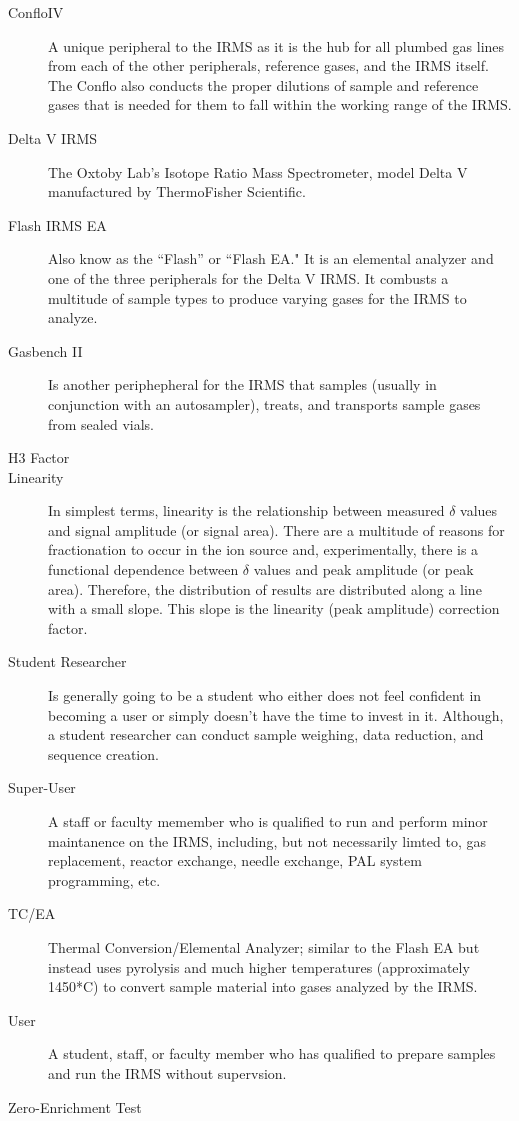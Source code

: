 \documentclass[12pt]{../SOP4_alpha}\usepackage[]{graphicx}\usepackage[]{color}
\begin{document}
\begin{description}

\item[ConfloIV] A unique peripheral to the IRMS as it is the hub for all plumbed gas lines from each of the other peripherals, reference gases, and the IRMS itself. The Conflo also conducts the proper dilutions of sample and reference gases that is needed for them to fall within the working range of the IRMS.

\item[Delta V IRMS] \label{IRMS} The Oxtoby Lab's Isotope Ratio Mass Spectrometer, model Delta V manufactured by ThermoFisher Scientific. 

\item[Flash IRMS EA] Also know as the ``Flash'' or ``Flash EA." It is an elemental analyzer and one of the three peripherals for the Delta V IRMS. It combusts a multitude of sample types to produce varying gases for the IRMS to analyze. 

\item[Gasbench II] Is another periphepheral for the IRMS that samples (usually in conjunction with an autosampler), treats, and transports sample gases from sealed vials.

\item[H3 Factor]

\item[Linearity] In simplest terms, linearity is the relationship between measured $\delta$ values and signal amplitude (or signal area). There are a multitude of reasons for fractionation to occur in the ion source and, experimentally, there is a functional dependence between $\delta$ values and peak amplitude (or peak area). Therefore, the distribution of results are distributed along a line with a small slope. This slope is the linearity (peak amplitude) correction factor. 

\item[Student Researcher] Is generally going to be a student who either does not feel confident in becoming a user or simply doesn't have the time to invest in it. Although, a student researcher can conduct sample weighing, data reduction, and sequence creation.

\item[Super-User] \label{Super-User} A staff or faculty memember who is qualified to run and perform minor maintanence on the IRMS, including, but not necessarily limted to, gas replacement, reactor exchange, needle exchange, PAL system programming, etc.  

\item[TC/EA] Thermal Conversion/Elemental Analyzer; similar to the Flash EA but instead uses pyrolysis and much higher temperatures (approximately 1450*C) to convert sample material into gases analyzed by the IRMS.

\item[User] A student, staff, or faculty member who has qualified to prepare samples and run the IRMS without supervsion.

\item[Zero-Enrichment Test]

\end{description}
\end{document}
